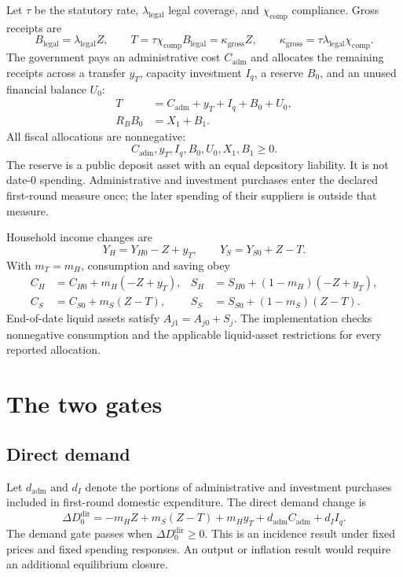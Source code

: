 \documentclass[11pt]{article}
\newcommand{\DD}{\Delta D_0^{\mathrm{dir}}}
\begin{document}
Let $\tau$ be the statutory rate, $\lambda_{\mathrm{legal}}$ legal coverage, and
$\chi_{\mathrm{comp}}$ compliance. Gross receipts are
\begin{equation}
B_{\mathrm{legal}}=\lambda_{\mathrm{legal}}Z,
\qquad
T=\tau\chi_{\mathrm{comp}}B_{\mathrm{legal}}
=\kappa_{\mathrm{gross}}Z,
\qquad
\kappa_{\mathrm{gross}}=\tau\lambda_{\mathrm{legal}}\chi_{\mathrm{comp}}.
\end{equation}
The government pays an administrative cost $C_{\mathrm{adm}}$ and allocates the
remaining receipts across a transfer $y_T$, capacity investment $I_q$, a reserve
$B_0$, and an unused financial balance $U_0$:
\begin{align}
T&=C_{\mathrm{adm}}+y_T+I_q+B_0+U_0,\\
R_BB_0&=X_1+B_1.
\end{align}
All fiscal allocations are nonnegative:
\[
C_{\mathrm{adm}},y_T,I_q,B_0,U_0,X_1,B_1\geq0.
\]
The reserve is a public deposit asset with an equal depository liability. It is
not date-0 spending. Administrative and investment purchases enter the declared
first-round measure once; the later spending of their suppliers is outside that
measure.

Household income changes are
\[
Y_H=Y_{H0}-Z+y_T,
\qquad
Y_S=Y_{S0}+Z-T.
\]
With $m_T=m_H$, consumption and saving obey
\begin{align}
C_H&=C_{H0}+m_H(-Z+y_T),
&S_H&=S_{H0}+(1-m_H)(-Z+y_T),\\
C_S&=C_{S0}+m_S(Z-T),
&S_S&=S_{S0}+(1-m_S)(Z-T).
\end{align}
End-of-date liquid assets satisfy $A_{j1}=A_{j0}+S_j$. The implementation checks
nonnegative consumption and the applicable liquid-asset restrictions for every
reported allocation.

\section{The two gates}

\subsection{Direct demand}

Let $d_{\mathrm{adm}}$ and $d_I$ denote the portions of administrative and
investment purchases included in first-round domestic expenditure. The direct
demand change is
\begin{equation}
\boxed{
\DD=-m_HZ+m_S(Z-T)+m_Hy_T
+d_{\mathrm{adm}}C_{\mathrm{adm}}+d_II_q.}
\end{equation}
The demand gate passes when $\DD\geq0$. This is an incidence result under fixed
prices and fixed spending responses. An output or inflation result would require
an additional equilibrium closure.
\end{document}
